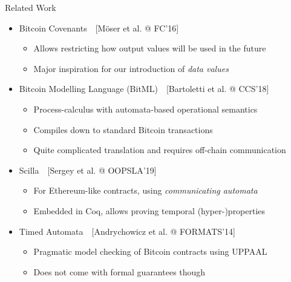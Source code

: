 \begin{frame}{Related Work}

\begin{itemize}
\item \alert{Bitcoin Covenants}~~[Möser et al. @ FC'16]
  \begin{itemize}
  \item Allows restricting how output values will be used in the future
  \item Major inspiration for our introduction of \textit{data values}
  \end{itemize}
\item \alert{Bitcoin Modelling Language (BitML)}~~[Bartoletti et al. @ CCS'18]
  \begin{itemize}
  \item Process-calculus with automata-based operational semantics
  \item Compiles down to standard Bitcoin transactions
  \item Quite complicated translation and requires off-chain communication
  \end{itemize}
\item \alert{Scilla}~~[Sergey et al. @ OOPSLA'19]
  \begin{itemize}
  \item For Ethereum-like contracts, using \textit{communicating automata}
  \item Embedded in Coq, allows proving temporal (hyper-)properties
  \end{itemize}
\item \alert{Timed Automata}~~[Andrychowicz et al. @ FORMATS'14]
  \begin{itemize}
  \item Pragmatic model checking of Bitcoin contracts using \textsc{UPPAAL}
  \item Does not come with formal guarantees though
  \end{itemize}
\end{itemize}

\end{frame}

